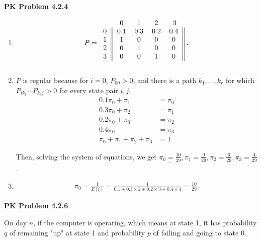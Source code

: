 \documentclass{article}
\begin{document}
\textbf{PK Problem 4.2.4}
\begin{enumerate}[label={(\alph*)}]
    \item 
    \begin{align*}
        P & = 
        \begin{blockarray}{ccccc}
            & 0 & 1 & 2 & 3 \\
            \begin{block}{c||cccc||}
                0 & 0.1 & 0.3 & 0.2 & 0.4 \\
                1 & 1 & 0 & 0 & 0 \\
                2 & 0 & 1 & 0 & 0 \\
                3 & 0 & 0 & 1 & 0 \\
            \end{block}
        \end{blockarray}\; . \nonumber \\
    \end{align*}

    \item
    $P$ is regular because for $i = 0$, $P_{00} > 0$, and there is a path $k_1, \dots, k_r$ for which $P_{ik_1}\cdots P_{k_rj} > 0$ for every state pair $i,j$.
    \begin{align*}
        0.1\pi_0 + \pi_1 & = \pi_0 \\
        0.3\pi_0 + \pi_2 & = \pi_1 \\
        0.2\pi_0 + \pi_3 & = \pi_2 \\
        0.4\pi_0 & = \pi_3 \\
        \pi_0 + \pi_1 + \pi_2 + \pi_3 & = 1
    \end{align*}

    Then, solving the system of equations, we get $\underline{\pi_0 = \frac{10}{29}}, \pi_1 = \frac{9}{29}, \pi_2 = \frac{6}{29}, \pi_3 = \frac{4}{29}$.

    \item
    \begin{align*}
        \pi_0 = \frac{1}{E[\xi]} = \frac{1}{0.1 + 0.3\times 2 + 0.2\times 3 + 0.4\times 4} = \frac{10}{29}.
    \end{align*}
\end{enumerate}
\bigbreak

\textbf{PK Problem 4.2.6} 

On day $n$, if the computer is operating, which means at state 1, it has probability $q$ of remaining "up" at state 1 and probability $p$ of failing and going to state 0.
\end{document}
